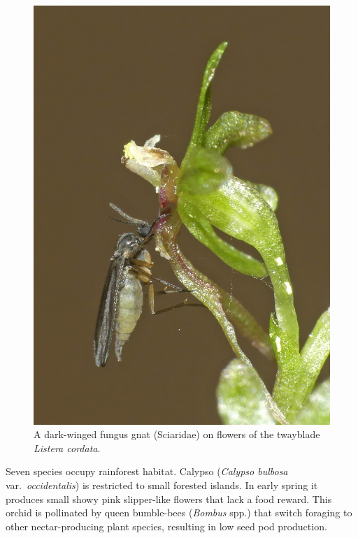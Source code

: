 \begin{multicols}{2}

\begin{figure}[H]
\begin{center}
\includegraphics[width=\textwidth]{img/Sciaridae.jpg}
\caption{A dark-winged fungus gnat (Sciaridae) on flowers of the twayblade \emph{Listera cordata}.}
\label{Sciaridae}
\end{center}
\end{figure}

Seven species occupy rainforest habitat. Calypso (\emph{Calypso bulbosa}
var.\ \emph{occidentalis}) is restricted to small forested islands. In
early spring it produces small showy pink slipper-like flowers that lack
a food reward. This orchid is pollinated by queen bumble-bees
(\emph{Bombus} spp.) that switch foraging to other nectar-producing plant
species, resulting in low seed pod production.




\end{multicols}
